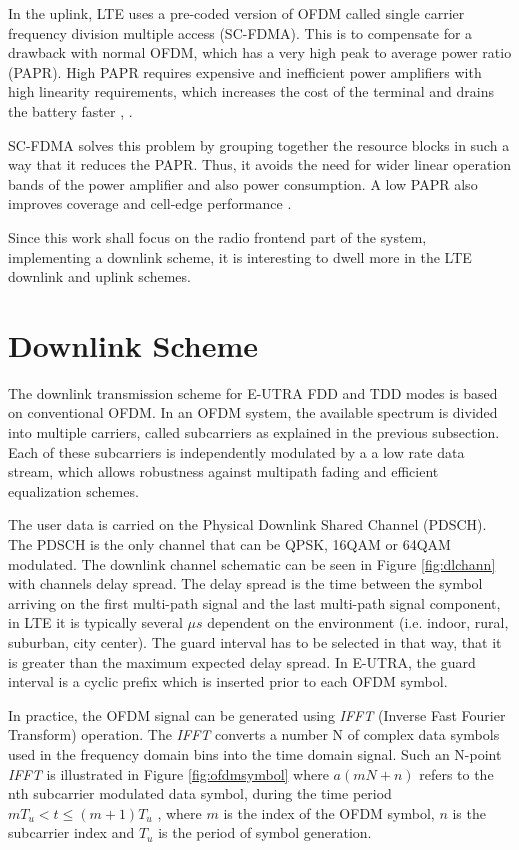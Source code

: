 In the uplink, LTE uses a pre-coded version of OFDM called single carrier
frequency division multiple access (SC-FDMA). This is to compensate for a
drawback with normal OFDM, which has a very high peak to average power ratio
(PAPR). High PAPR requires expensive and inefficient power amplifiers with high
linearity requirements, which increases the cost of the terminal and drains the
battery faster \cite{introlte}, \cite{umtslte}.

SC-FDMA solves this problem by grouping together the resource blocks in such a
way that it reduces the PAPR. Thus, it avoids the need for wider linear
operation bands of the power amplifier and also power consumption. A low PAPR
also improves coverage and cell-edge performance \cite{introlte}.

Since this work shall focus on the radio frontend part of the system, implementing
a downlink scheme, it is interesting to dwell more in the LTE downlink and uplink
schemes.

\section{Downlink Scheme}%

The downlink transmission scheme for E-UTRA FDD and TDD modes is based on
conventional OFDM. In an OFDM system, the available spectrum is divided into
multiple carriers, called subcarriers as explained in the previous subsection.
Each of these subcarriers is independently modulated by a a low rate data
stream, which allows robustness against multipath fading and efficient
equalization schemes.

The user data is carried on the Physical Downlink Shared Channel (PDSCH). The
PDSCH is the only channel that can be QPSK, 16QAM or 64QAM modulated. The
downlink channel schematic can be seen in Figure \ref{fig:dlchann} with channels
delay spread. The delay spread is the time between the symbol arriving on the
first multi-path signal and the last multi-path signal component, in LTE it is
typically several $\mu s$ dependent on the environment (i.e. indoor, rural,
suburban, city center). The guard interval has to be selected in that way, that
it is greater than the maximum expected delay spread. In E-UTRA, the guard
interval is a cyclic prefix which is inserted prior to each OFDM symbol.

In practice, the OFDM signal can be generated using \textit{IFFT} (Inverse Fast
Fourier Transform) operation. The \textit{IFFT} converts a number N of complex
data symbols used in the frequency domain bins into the time domain signal. Such
an N-point \textit{IFFT} is illustrated in Figure \ref{fig:ofdmsymbol} where
$a(mN+n)$ refers to the nth subcarrier modulated data symbol, during the time
period $mT_u < t \le (m+1)T_u$ \cite{umtslte}, where $m$ is the index of the
OFDM symbol, $n$ is the subcarrier index and $T_u$ is the period of symbol
generation.


